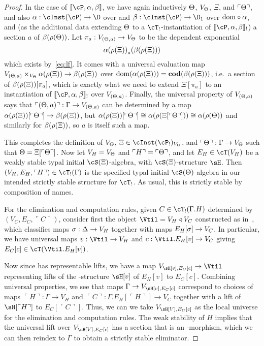 \documentclass{amsart}
\def\name#1{\ulcorner #1\urcorner}
\let\S\cS
\let\P\cP
\def\termps#1#2#3{\llbracket #1,#2,#3\rrbracket}
\let\C\cC
\let\T\cT
\begin{document}
\begin{proof}
  In the case of $\termps{\P}{\al}{\be}$, we have again inductively $\Theta$, $V_\Theta$, $\Xi$, and $\name{\Th}$, and also $\al:\cInst(\P)\to\D$ over \C and $\be:\cInst(\P)\to\D_1$ over $\mathrm{dom}\circ \alpha$, and (as the additional data extending $\Theta$ to a $\T_!$-instantiation of $\termps{\P}{\al}{\be}_!$) a section $a$ of $\beta(\rho(\Theta))$.
  Let $\pi_a : V_{(\Theta,a)} \to V_\Theta$ to be the dependent exponential
  \[ {\alpha(\rho(\Xi))}_*(\beta(\rho(\Xi))) \]
  which exists by~\eqref{eq:lf}.
  It comes with a universal evaluation map $V_{(\Theta,a)} \times_{V_\Theta} \alpha(\rho(\Xi)) \to \beta(\rho(\Xi))$ over $\mathrm{dom}(\alpha(\rho(\Xi))) = \mathbf{cod}(\beta(\rho(\Xi)))$, i.e.\ a section of $\beta(\rho(\Xi))[\pi_a]$, which is exactly what we need to extend $\Xi[\pi_a]$ to an instantiation of $\termps{\P}{\al}{\be}_!$ over $V_{(\Theta,a)}$.
  Finally, the universal property of $V_{(\Theta,a)}$ says that $\name{(\Th,a)} : \Gamma \to V_{(\Th,a)}$ can be determined by a map $\al(\rho(\Xi))[\name{\Th}] \to \be(\rho(\Xi))$, but $\al(\rho(\Xi))[\name{\Th}] \cong \al(\rho(\Xi[\name{\Th}])) \cong \al(\rho(\Th))$ and similarly for $\beta(\rho(\Xi))$, so $a$ is itself such a map.
  
  This completes the definition of $V_\Theta$, $\Xi\in\cInst(\P_!)_{V_\Th}$, and $\name{\Th} : \Gamma\to V_\Th$ such that $\Th = \Xi[\name{\Th}]$.
  Now let $V_H = V_\Theta$ and $\name{H} = \name{\Th}$, and let $E_H\in\T(V_H)$ be a weakly stable typal initial $\S(\Xi)$-algebra, with $\S(\Xi)$-structure $\sH$.
  Then $(V_H,E_H,\name{H})\in\T_!(\Gamma)$ is the specified typal initial $\S(\Th)$-algebra in our intended strictly stable structure for $\T_!$.
  As usual, this is strictly stable by composition of names.

  For the elimination and computation rules, given $C\in \T_!(\Gamma.H)$ determined by $(V_C,E_C,\name{C})$, consider first the object $\Vtil = V_H\triangleleft V_C$ constructed as in~\cite{lw:localuniv}, which classifies maps $\sigma : \Delta \to V_H$ together with maps $E_H[\sigma] \to V_C$.
  In particular, we have universal maps $v:\Vtil\to V_H$ and $c:\Vtil.E_H[v]\to V_C$ giving $E_C[c]\in \T(\Vtil.E_H[v])$.

  Now since \S has representable lifts, we have a map $V_{\sH[v],E_C[c]} \to \Vtil$ representing lifts of the \S-structure $\sH[v]$ of $E_H[v]$ to $E_C[c]$.
  Combining universal properties, we see that maps $\Gamma\to V_{\sH[v],E_C[c]}$ correspond to choices of maps $\name{H}:\Gamma\to V_H$ and $\name{C}:\Gamma.E_H[\name{H}]\to V_C$ together with a lift of $\sH[\name{H}]$ to $E_C[\name{C}]$.
  Thus, we can we take $V_{\sH[V],E_C[c]}$ as the local universe for the elimination and computation rules.
  The weak stability of $H$ implies that the universal lift over $V_{\sH[V],E_C[c]}$ has a section that is an \S-morphism, which we can then reindex to $\Gamma$ to obtain a strictly stable eliminator.
\end{proof}
\end{document}
